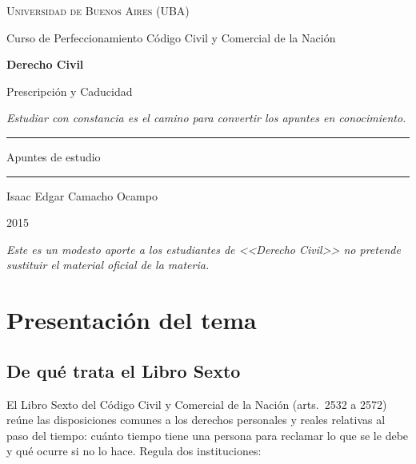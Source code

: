 \documentclass[12pt,oneside]{book}
\newcommand{\universidad}{Universidad de Buenos Aires (UBA)}
\newcommand{\carrera}{Curso de Perfeccionamiento \textperiodcentered{} C\'odigo Civil y Comercial de la Naci\'on}
\newcommand{\materia}{Derecho Civil}
\newcommand{\titulo}{Prescripci\'on y Caducidad}
\newcommand{\autor}{Isaac Edgar Camacho Ocampo}
\newcommand{\anio}{2015}
\begin{document}
\begin{titlepage}
\thispagestyle{empty}
\begin{center}
\vspace*{1cm}
{\large \textsc{\universidad}}
\vspace{0.2cm}

{\large \carrera}
\vspace{3cm}

{\Huge \textbf{\materia}}
\vspace{1cm}

{\LARGE \titulo}
\vspace{0.8cm}

\textit{Estudiar con constancia es el camino para convertir los apuntes en conocimiento.}
\vspace{1.2cm}

\rule{0.70\textwidth}{0.5pt}
\vspace{0.5cm}

{\large Apuntes de estudio}
\vspace{0.5cm}

\rule{0.70\textwidth}{0.5pt}
\vfill
{\large \autor}
\vspace{0.3cm}

{\large \anio}
\end{center}
\vfill
\begin{flushleft}
\textit{Este es un modesto aporte a los estudiantes de <<\materia>> no pretende sustituir el material oficial de la materia.}
\end{flushleft}
\end{titlepage}

\tableofcontents

\chapter{Presentaci\'on del tema}

\section{De qu\'e trata el Libro Sexto}

El Libro Sexto del C\'odigo Civil y Comercial de la Naci\'on (arts.\ 2532 a 2572) re\'une las disposiciones comunes a los derechos personales y reales relativas al paso del tiempo: cu\'anto tiempo tiene una persona para reclamar lo que se le debe y qu\'e ocurre si no lo hace. Regula dos instituciones:
\end{document}
